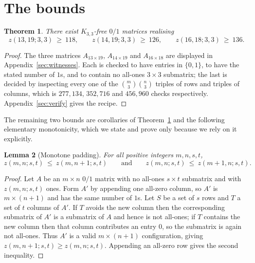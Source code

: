 \documentclass[11pt,reqno]{amsart}
\theoremstyle{plain}
\newtheorem{theorem}{Theorem}
\newtheorem{lemma}[theorem]{Lemma}
\theoremstyle{remark}
\newcommand{\zz}{z}
\begin{document}
\section{The bounds}

\begin{theorem}\label{thm:main}
There exist $K_{3,3}$-free $0/1$ matrices realising
\[
  \zz(13,19;3,3)\ \ge\ 118,\qquad
  \zz(14,19;3,3)\ \ge\ 126,\qquad
  \zz(16,18;3,3)\ \ge\ 136 .
\]
\end{theorem}

\begin{proof}
The three matrices $A_{13\times19}$, $A_{14\times19}$ and $A_{16\times18}$ are displayed in
Appendix~\ref{sec:witnesses}. Each is checked to have entries in $\{0,1\}$, to have the stated number
of $1$s, and to contain no all-ones $3\times 3$ submatrix; the last is decided by inspecting every
one of the $\binom{m}{3}\binom{n}{3}$ triples of rows and triples of columns, which is $277{,}134$,
$352{,}716$ and $456{,}960$ checks respectively. Appendix~\ref{sec:verify} gives the recipe.
\end{proof}

The remaining two bounds are corollaries of Theorem~\ref{thm:main} and the following elementary
monotonicity, which we state and prove only because we rely on it explicitly.

\begin{lemma}[Monotone padding]\label{lem:pad}
For all positive integers $m,n,s,t$,
\[
  \zz(m,n;s,t)\ \le\ \zz(m,n+1;s,t)
  \qquad\text{and}\qquad
  \zz(m,n;s,t)\ \le\ \zz(m+1,n;s,t).
\]
\end{lemma}

\begin{proof}
Let $A$ be an $m\times n$ $0/1$ matrix with no all-ones $s\times t$ submatrix and with
$\zz(m,n;s,t)$ ones. Form $A'$ by appending one all-zero column, so $A'$ is $m\times(n+1)$ and has
the same number of $1$s. Let $S$ be a set of $s$ rows and $T$ a set of $t$ columns of $A'$. If $T$
avoids the new column then the corresponding submatrix of $A'$ is a submatrix of $A$ and hence is not
all-ones; if $T$ contains the new column then that column contributes an entry $0$, so the submatrix
is again not all-ones. Thus $A'$ is a valid $m\times(n+1)$ configuration, giving
$\zz(m,n+1;s,t)\ge\zz(m,n;s,t)$. Appending an all-zero row gives the second inequality.
\end{proof}
\end{document}
